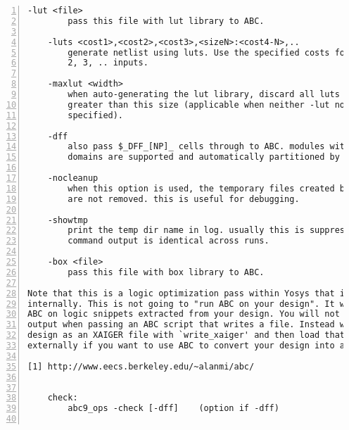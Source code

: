 \begin{lstlisting}[numbers=left,frame=single]
    -lut <file>
        pass this file with lut library to ABC.

    -luts <cost1>,<cost2>,<cost3>,<sizeN>:<cost4-N>,..
        generate netlist using luts. Use the specified costs for luts with 1,
        2, 3, .. inputs.

    -maxlut <width>
        when auto-generating the lut library, discard all luts equal to or
        greater than this size (applicable when neither -lut nor -luts is
        specified).

    -dff
        also pass $_DFF_[NP]_ cells through to ABC. modules with many clock
        domains are supported and automatically partitioned by ABC.

    -nocleanup
        when this option is used, the temporary files created by this pass
        are not removed. this is useful for debugging.

    -showtmp
        print the temp dir name in log. usually this is suppressed so that the
        command output is identical across runs.

    -box <file>
        pass this file with box library to ABC.

Note that this is a logic optimization pass within Yosys that is calling ABC
internally. This is not going to "run ABC on your design". It will instead run
ABC on logic snippets extracted from your design. You will not get any useful
output when passing an ABC script that writes a file. Instead write your full
design as an XAIGER file with `write_xaiger' and then load that into ABC
externally if you want to use ABC to convert your design into another format.

[1] http://www.eecs.berkeley.edu/~alanmi/abc/


    check:
        abc9_ops -check [-dff]    (option if -dff)


\end{lstlisting}
